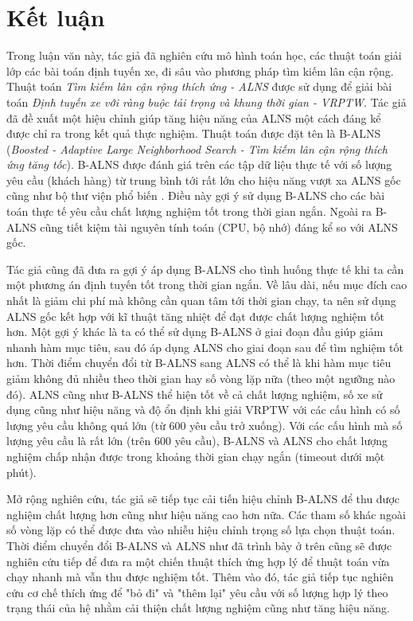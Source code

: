 \chapter{Kết luận}
\label{chap:conclusion}

Trong luận văn này, tác giả đã nghiên cứu mô hình toán học, các thuật toán giải lớp các bài toán định tuyến xe, đi sâu vào phương pháp tìm kiếm lân cận rộng. Thuật toán \textit{Tìm kiếm lân cận rộng thích ứng - ALNS} được sử dụng để giải bài toán \textit{Định tuyến xe với ràng buộc tải trọng và khung thời gian - VRPTW}. Tác giả đã đề xuất một hiệu chỉnh giúp tăng hiệu năng của ALNS một cách đáng kể được chỉ ra trong kết quả thực nghiệm. Thuật toán được đặt tên là B-ALNS (\textit{Boosted - Adaptive Large Neighborhood Search - Tìm kiếm lân cận rộng thích ứng tăng tốc}). B-ALNS được đánh giá trên các tập dữ liệu thực tế với số lượng yêu cầu (khách hàng) từ trung bình tới rất lớn cho hiệu năng vượt xa ALNS gốc cũng như bộ thư viện phổ biến . Điều này gợi ý sử dụng B-ALNS cho các bài toán thực tế yêu cầu chất lượng nghiệm tốt trong thời gian ngắn. Ngoài ra B-ALNS cũng tiết kiệm tài nguyên tính toán (CPU, bộ nhớ) đáng kể so với ALNS gốc.

Tác giả cũng đã đưa ra gợi ý áp dụng B-ALNS cho tình huống thực tế khi ta cần một phương án định tuyến tốt trong thời gian ngắn. Về lâu dài, nếu mục đích cao nhất là giảm chi phí mà không cần quan tâm tới thời gian chạy, ta nên sử dụng ALNS gốc kết hợp với kĩ thuật tăng nhiệt để đạt được chất lượng nghiệm tốt hơn. Một gợi ý khác là ta có thể sử dụng B-ALNS ở giai đoạn đầu giúp giảm nhanh hàm mục tiêu, sau đó áp dụng ALNS cho giai đoạn sau để tìm nghiệm tốt hơn. Thời điểm chuyển đổi từ B-ALNS sang ALNS có thể là khi hàm mục tiêu giảm không đủ nhiều theo thời gian hay số vòng lặp nữa (theo một ngưỡng nào đó). ALNS cũng như B-ALNS thể hiện tốt về cả chất lượng nghiệm, số xe sử dụng cũng như hiệu năng và độ ổn định khi giải VRPTW với các cấu hình có số lượng yêu cầu không quá lớn (từ $600$ yêu cầu trở xuống). Với các cấu hình mà số lượng yêu cầu là rất lớn (trên $600$ yêu cầu), B-ALNS và ALNS cho chất lượng nghiệm chấp nhận được trong khoảng thời gian chạy ngắn (timeout dưới một phút).

Mở rộng nghiên cứu, tác giả sẽ tiếp tục cải tiến hiệu chỉnh B-ALNS để thu được nghiệm chất lượng hơn cũng như hiệu năng cao hơn nữa. Các tham số khác ngoài số vòng lặp có thể được đưa vào nhiễu hiệu chỉnh trọng số lựa chọn thuật toán. Thời điểm chuyển đổi B-ALNS và ALNS như đã trình bày ở trên cũng sẽ được nghiên cứu tiếp để đưa ra một chiến thuật thích ứng hợp lý để thuật toán vừa chạy nhanh mà vẫn thu được nghiệm tốt. Thêm vào đó, tác giả tiếp tục nghiên cứu cơ chế thích ứng để "bỏ đi" và "thêm lại" yêu cầu với số lượng hợp lý theo trạng thái của hệ nhằm cải thiện chất lượng nghiệm cũng như tăng hiệu năng.

